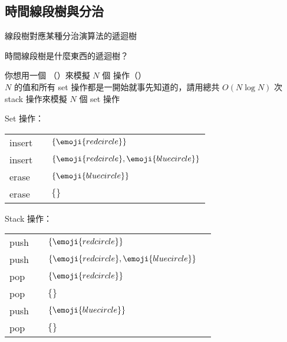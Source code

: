 \subsection{時間線段樹與分治}

\begin{frame}{\ectitle}
    線段樹對應某種分治演算法的遞迴樹

    時間線段樹是什麼東西的遞迴樹？
\end{frame}

\begin{frame}{\ectitle}
    \begin{problem}
        你想用一個 （）來模擬 $N$ 個  操作（） \\

	    $N$ 的值和所有 set 操作都是一開始就事先知道的，請用總共 $O(N \log N)$ 次 stack 操作來模擬 $N$ 個 set 操作
    \end{problem}
\end{frame}

\newcommand{\CR}{\emoji{red circle}}
\newcommand{\CB}{\emoji{blue circle}}
\newcommand{\OK}{\emoji{check mark button}}
\begin{frame}{\ectitle}
    \begin{multicols}{2}
        Set 操作：
        \begin{table}
            \begin{tabular}{| l p{0.2cm} l |}
                \hline
                insert \CR  && $\{\CR\}$ \\
                insert \CB && $\{\CR, \CB\}$ \\
                erase \CR   && $\{\CB\}$ \\
                erase \CB  && $\{\}$ \\
                \hline
            \end{tabular}
        \end{table}
        \columnbreak
         { \hspace{5cm} }
         {
            Stack 操作：
            \begin{table}
                \begin{tabular}{| l p{0.2cm} l l |}
                    \hline
                    push \CR && $\{\CR\}$      & \OK \\
                    push \CB && $\{\CR, \CB\}$ & \OK \\
                    pop  \CB && $\{\CR\}$      &     \\
                    pop  \CR && $\{\}$         &     \\
                    push \CB && $\{\CB\}$      & \OK \\
                    pop  \CB && $\{\}$         & \OK \\
                    \hline
                \end{tabular}
            \end{table}
        }
    \end{multicols}
\end{frame}

